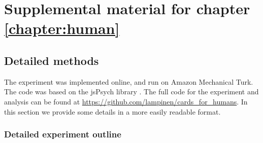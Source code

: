 \chapter{Supplemental material for chapter \ref{chapter:human}} \label{appendix:human}

\section{Detailed methods}
The experiment was implemented online, and run on Amazon Mechanical Turk. The code was based on the jsPsych library \citep{DeLeeuw2015}. The full code for the experiment and analysis can be found at \url{https://github.com/lampinen/cards_for_humans}. In this section we provide some details in a more easily readable format.

\subsection{Detailed experiment outline}


